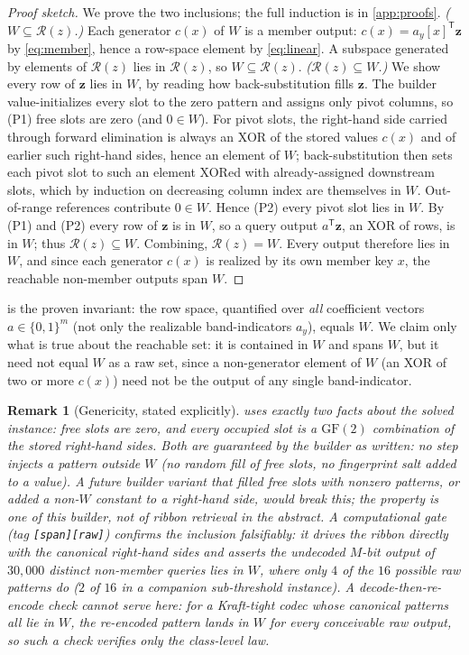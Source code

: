 \documentclass[acmsmall,review]{acmart}
\newtheorem{remark}{Remark}
\newcommand{\B}{\{0,1\}}
\newcommand{\GF}{\mathrm{GF}(2)}
\newcommand{\W}{W}                          %
\newcommand{\Rz}{\mathcal{R}(z)}            %
\newcommand{\bz}{\mathbf{z}}                %
\newcommand{\ay}{a_y}                       %
\newcommand{\cx}{c(x)}                      %
\begin{document}
\begin{proof}[Proof sketch]
We prove the two inclusions; the full induction is in \cref{app:proofs}.
\emph{($\W \subseteq \Rz$.)} Each generator $\cx$ of $\W$ is a member output:
$\cx = \ay[x]^{\mathsf T}\bz$ by \eqref{eq:member}, hence a row-space element by
\eqref{eq:linear}. A subspace generated by elements of $\Rz$ lies in $\Rz$, so
$\W \subseteq \Rz$.
\emph{($\Rz \subseteq \W$.)} We show every row of $\bz$ lies in $\W$, by reading how
back-substitution fills $\bz$. The builder value-initializes every slot to the zero
pattern and assigns only pivot columns, so (P1) free slots are zero (and $0 \in \W$).
For pivot slots, the right-hand side carried through forward elimination is always an
XOR of the stored values $\cx$ and of earlier such right-hand sides, hence an element
of $\W$; back-substitution then sets each pivot slot to such an element XORed with
already-assigned downstream slots, which by induction on decreasing column index are
themselves in $\W$. Out-of-range references contribute $0 \in \W$. Hence (P2) every
pivot slot lies in $\W$. By (P1) and (P2) every row of $\bz$ is in $\W$, so a query
output $a^{\mathsf T}\bz$, an XOR of rows, is in $\W$; thus $\Rz \subseteq \W$.
Combining, $\Rz = \W$. Every output therefore lies in $\W$, and since each generator
$\cx$ is realized by its own member key $x$, the reachable non-member outputs span
$\W$.
\end{proof}

 is the proven invariant: the row space, quantified over
\emph{all} coefficient vectors $a \in \B^m$ (not only the realizable band-indicators
$\ay$), equals $\W$. We claim only what is true about the reachable set: it is
contained in $\W$ and spans $\W$, but it need not equal $\W$ as a raw set, since a
non-generator element of $\W$ (an XOR of two or more $\cx$) need not be the output of
any single band-indicator.

\begin{remark}[Genericity, stated explicitly]
\label{rem:genericity}
 uses exactly two facts about the solved instance: free slots are
zero, and every occupied slot is a $\GF$ combination of the stored right-hand sides.
Both are guaranteed by the builder as written: no step injects a pattern outside $\W$
(no random fill of free slots, no fingerprint salt added to a value). A future builder
variant that filled free slots with nonzero patterns, or added a non-$\W$ constant to
a right-hand side, would break this; the property is one of \emph{this} builder, not
of ribbon retrieval in the abstract. A computational gate (tag
\texttt{[span][raw]}) confirms the inclusion falsifiably: it drives the ribbon directly
with the canonical right-hand sides and asserts the \emph{undecoded} $M$-bit output of
$30{,}000$ distinct non-member queries lies in $\W$, where only $4$ of the $16$ possible
raw patterns do ($2$ of $16$ in a companion sub-threshold instance). A
decode-then-re-encode check cannot serve here: for a Kraft-tight codec whose canonical
patterns all lie in $\W$, the re-encoded pattern lands in $\W$ for \emph{every}
conceivable raw output, so such a check verifies only the class-level law.
\end{remark}
\end{document}
